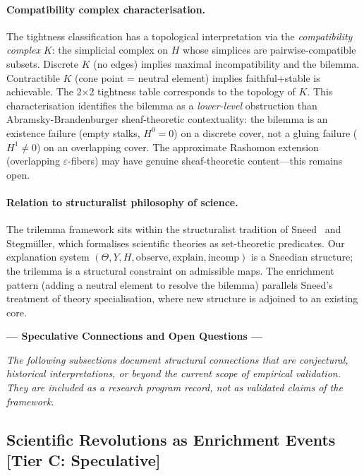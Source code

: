 \documentclass[11pt,a4paper]{article}
\begin{document}
\paragraph{Compatibility complex characterisation.}
The tightness classification has a topological interpretation via the \emph{compatibility complex} $K$: the simplicial complex on $H$ whose simplices are pairwise-compatible subsets. Discrete $K$ (no edges) implies maximal incompatibility and the bilemma. Contractible $K$ (cone point = neutral element) implies faithful+stable is achievable. The 2$\times$2 tightness table corresponds to the topology of $K$. This characterisation identifies the bilemma as a \emph{lower-level} obstruction than Abramsky-Brandenburger sheaf-theoretic contextuality: the bilemma is an existence failure (empty stalks, $H^0 = 0$) on a discrete cover, not a gluing failure ($H^1 \neq 0$) on an overlapping cover. The approximate Rashomon extension (overlapping $\varepsilon$-fibers) may have genuine sheaf-theoretic content---this remains open.

\paragraph{Relation to structuralist philosophy of science.}
The trilemma framework sits within the structuralist tradition of Sneed~\cite{sneed1971logical} and Stegm\"uller, which formalises scientific theories as set-theoretic predicates. Our explanation system $(\Theta, Y, H, \text{observe}, \text{explain}, \text{incomp})$ is a Sneedian structure; the trilemma is a structural constraint on admissible maps. The enrichment pattern (adding a neutral element to resolve the bilemma) parallels Sneed's treatment of theory specialisation, where new structure is adjoined to an existing core.

\bigskip
\noindent\textbf{--- Speculative Connections and Open Questions ---}

\medskip
\noindent\emph{The following subsections document structural connections that
are conjectural, historical interpretations, or beyond the current scope
of empirical validation.  They are included as a research program record,
not as validated claims of the framework.}

\subsection{Scientific Revolutions as Enrichment Events\,\textnormal{\normalsize[Tier C: Speculative]}}
\label{sec:revolutions}
\end{document}
